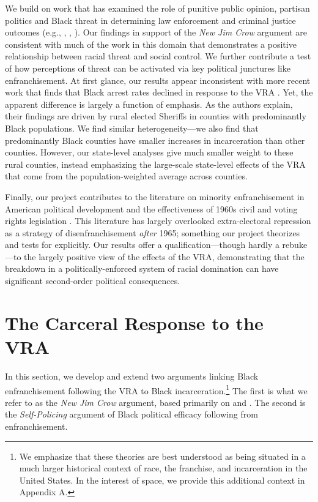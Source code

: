 \documentclass[12pt]{article}
\begin{document}
We build on work that has examined the role of punitive public opinion, partisan politics and Black threat in determining law enforcement and criminal justice outcomes (e.g., \cite{Jacobs:1996wi} \cite{Fording:2001vz}, \cite{Yates:2005th}, \cite{Enns:2015vz}). Our findings in support of the \emph{New Jim Crow} argument are consistent with much of the work in this domain that demonstrates a positive relationship between racial threat and social control. We further contribute a test of how perceptions of threat can be activated via key political junctures like enfranchisement. At first glance, our results appear inconsistent with more recent work that finds that Black arrest rates declined in response to the VRA \citep{Facchini:2020tb}.  Yet, the apparent difference is largely a function of emphasis.  As the authors explain, their findings are driven by rural elected Sheriffs in counties with predominantly Black populations. We find similar heterogeneity---we also find that predominantly Black counties have smaller increases in incarceration than other counties.  However, our state-level analyses give much smaller weight to these rural counties, instead emphasizing the large-scale state-level effects of the VRA that come from the population-weighted average across counties.

Finally, our project contributes to the literature on minority enfranchisement in American political development and the effectiveness of 1960s civil and voting rights legislation \citep{Kousser:1974ty,Grofman:1994vf,Davidson:1994ue}.  This literature has largely overlooked extra-electoral repression as a strategy of disenfranchisement \emph{after} 1965; something our project theorizes and tests for explicitly.  Our results offer a qualification---though hardly a rebuke---to the largely positive view of the effects of the VRA, demonstrating that the breakdown in a politically-enforced system of racial domination can have significant second-order political consequences.









\section*{The Carceral Response to the VRA}

In this section, we develop and extend two arguments linking Black enfranchisement following the VRA to Black incarceration.\footnote{We emphasize that these theories are best understood as being situated in a much larger historical context of race, the franchise, and incarceration in the United States.  In the interest of space, we provide this additional context in Appendix A.}  The first is what we refer to as the \emph{New Jim Crow} argument, based primarily on \cite{Weaver:2007vr} and \cite{Alexander:2012tj}.  The second is the \emph{Self-Policing} argument of Black political efficacy following from enfranchisement.
\end{document}
